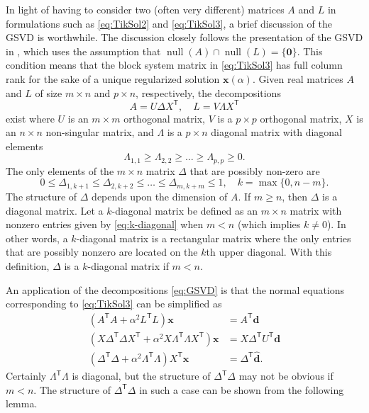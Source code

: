 \documentclass[12pt]{article}
\newcommand{\dVec}{\mathbf{d}}	%
\newcommand{\xVec}{\mathbf{x}}	%
\newcommand{\trans}[1]{{#1}^\mathsf{T}}	%
\DeclareMathOperator{\nullspace}{null}	%
\newcommand{\regparam}{\alpha}
\newcommand{\zeroVec}{\bm{0}}	%
\newcommand{\svd}[1]{\widehat{#1}}	%
\begin{document}
In light of having to consider two (often very different) matrices $A$ and $L$ in formulations such as \eqref{eq:TikSol2} and \eqref{eq:TikSol3}, a brief discussion of the GSVD is worthwhile. The discussion closely follows the presentation of the GSVD in \cite{ABT}, which uses the assumption that $\nullspace(A) \cap \nullspace(L) = \{\zeroVec\}$. This condition means that the block system matrix in \eqref{eq:TikSol3} has full column rank for the sake of a unique regularized solution $\xVec(\regparam)$. Given real matrices $A$ and $L$ of size $m \times n$ and $p \times n$, respectively, the decompositions
\begin{equation}
\label{eq:GSVD}
A = U\Delta\trans{X}, \quad L = V\Lambda\trans{X}
\end{equation}
exist where $U$ is an $m \times m$ orthogonal matrix, $V$ is a $p \times p$ orthogonal matrix, $X$ is an $n \times n$ non-singular matrix, and $\Lambda$ is a $p \times n$ diagonal matrix with diagonal elements
\[\Lambda_{1,1} \geq \Lambda_{2,2} \geq \ldots \geq \Lambda_{p,p} \geq 0.\]
The only elements of the $m \times n$ matrix $\Delta$ that are possibly non-zero are
\begin{equation}
\label{eq:k-diagonal}
 0 \leq \Delta_{1,k+1} \leq \Delta_{2,k+2} \leq \ldots \leq \Delta_{m,k+m} \leq 1, \quad k = \max \{0,n-m\}.
\end{equation}
The structure of $\Delta$ depends upon the dimension of $A$. If $m \geq n$, then $\Delta$ is a diagonal matrix. Let a $k$-diagonal matrix be defined as an $m \times n$ matrix with nonzero entries given by \eqref{eq:k-diagonal} when $m < n$ (which implies $k \neq 0$). In other words, a $k$-diagonal matrix is a rectangular matrix where the only entries that are possibly nonzero are located on the $k$th upper diagonal. With this definition, $\Delta$ is a $k$-diagonal matrix if $m < n$. \par 
An application of the decompositions \eqref{eq:GSVD} is that the normal equations corresponding to \eqref{eq:TikSol3} can be simplified as
\begin{align}
(\trans{A}A + \regparam^2 \trans{L}L)\xVec &= \trans{A}\dVec \nonumber \\
(X\trans{\Delta}\Delta\trans{X} + \regparam^2 X\trans{\Lambda}\Lambda\trans{X})\xVec &= X\trans{\Delta}\trans{U}\dVec \nonumber \\
(\trans{\Delta}\Delta + \regparam^2 \trans{\Lambda}\Lambda)\trans{X}\xVec &= \trans{\Delta}\svd{\dVec}.
\label{eq:Normal equation 2}
\end{align}
Certainly $\trans{\Lambda}\Lambda$ is diagonal, but the structure of $\trans{\Delta}\Delta$ may not be obvious if $m < n$. The structure of $\trans{\Delta}\Delta$ in such a case can be shown from the following lemma.
\end{document}
